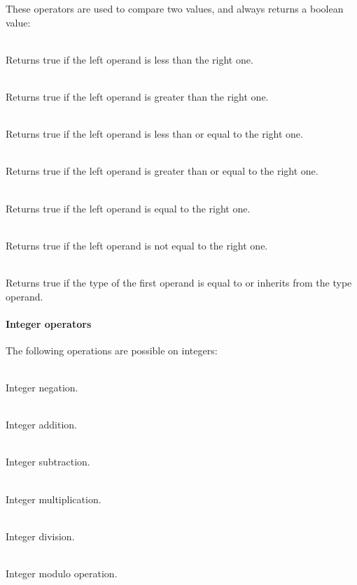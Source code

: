 These operators are used to compare two values, and always returns a boolean value:

\begin{dlist}
  \item {}\\
    Returns true if the left operand is less than the right one.
  \item {}\\
    Returns true if the left operand is greater than the right one.
  \item {}\\
    Returns true if the left operand is less than or equal to the right one.
  \item {}\\
    Returns true if the left operand is greater than or equal to the right one.
  \item {}\\
    Returns true if the left operand is equal to the right one.
  \item {}\\
    Returns true if the left operand is not equal to the right one.
  \item {}\\
    Returns true if the type of the first operand is equal to or inherits from
    the type operand.
\end{dlist}

\paragraph{Integer operators}

The following operations are possible on integers:

\begin{dlist}
  \item {} \\
    Integer negation.
  \item {} \\
    Integer addition.
  \item {} \\
    Integer subtraction.
  \item {} \\
    Integer multiplication.
  \item {} \\
    Integer division.
  \item {} \\
    Integer modulo operation.
\end{dlist}

